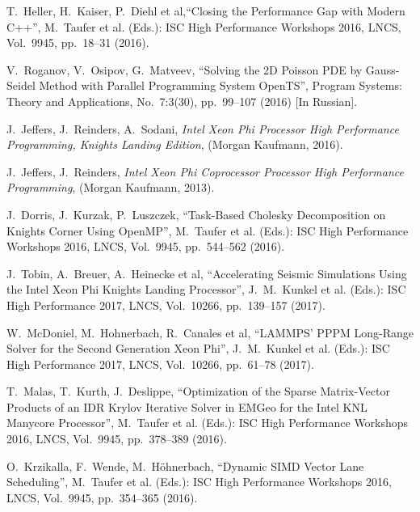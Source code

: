 \documentclass[
11pt,%
tightenlines,%
twoside,%
onecolumn,%
nofloats,%
nobibnotes,%
nofootinbib,%
superscriptaddress,%
noshowpacs,%
centertags]%
{revtex4}
\begin{document}
\begin{thebibliography}{99}
T.~Heller, H.~Kaiser, P.~Diehl et al,\textquotedblleft Closing the Performance Gap with Modern C++\textquotedblright, M.~Taufer et al. (Eds.): ISC High Performance Workshops 2016, LNCS, Vol.~9945, pp.~18--31 (2016).

V.~Roganov, V.~Osipov, G.~Matveev, \textquotedblleft Solving the
2D Poisson PDE by Gauss-Seidel Method with Parallel Programming System OpenTS\textquotedblright, Program Systems: Theory and Applications, No.~7:3(30), pp.~99--107 (2016) [In Russian].


J.~Jeffers, J.~Reinders, A.~Sodani, \emph{Intel Xeon Phi Processor High Performance Programming, Knights Landing Edition}, (Morgan Kaufmann, 2016).

J.~Jeffers, J.~Reinders, \emph{Intel Xeon Phi Coprocessor Processor High Performance Programming}, (Morgan Kaufmann, 2013).

J.~Dorris, J.~Kurzak, P.~Luszczek, \textquotedblleft Task-Based Cholesky Decomposition on Knights Corner Using OpenMP\textquotedblright, M.~Taufer et al. (Eds.): ISC High Performance Workshops 2016, LNCS, Vol.~9945, pp.~544--562 (2016).

J.~Tobin, A.~Breuer, A.~Heinecke et al, \textquotedblleft Accelerating Seismic Simulations Using the Intel Xeon Phi Knights Landing Processor\textquotedblright, J.~M.~Kunkel et al. (Eds.): ISC High Performance 2017, LNCS, Vol.~10266, pp.~139--157 (2017).

W.~McDoniel, M.~Hohnerbach, R.~Canales et al, \textquotedblleft LAMMPS' PPPM Long-Range Solver for the Second Generation Xeon Phi\textquotedblright, J.~M.~Kunkel et al. (Eds.): ISC High Performance 2017, LNCS, Vol.~10266, pp.~61--78 (2017).

T.~Malas, T.~Kurth, J.~Deslippe, \textquotedblleft Optimization of the Sparse Matrix-Vector Products of an IDR Krylov Iterative Solver in EMGeo for the Intel KNL Manycore Processor\textquotedblright, M.~Taufer et al. (Eds.): ISC High Performance Workshops 2016, LNCS, Vol.~9945, pp.~378--389 (2016).

O.~Krzikalla, F.~Wende, M.~H\"ohnerbach, \textquotedblleft Dynamic SIMD Vector Lane Scheduling\textquotedblright, M.~Taufer et al. (Eds.): ISC High Performance Workshops 2016, LNCS, Vol.~9945, pp.~354--365 (2016).


\end{thebibliography}
\end{document}
